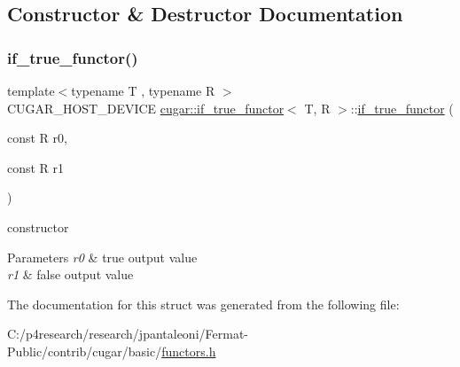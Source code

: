 \subsection{Constructor \& Destructor Documentation}
\mbox{\label{structcugar_1_1if__true__functor_a9374ed01b1416cc6eff2d6a5c8981a58}} 
\subsubsection{\texorpdfstring{if\+\_\+true\+\_\+functor()}{if\_true\_functor()}}
{\footnotesize\ttfamily template$<$typename T , typename R $>$ \\
C\+U\+G\+A\+R\+\_\+\+H\+O\+S\+T\+\_\+\+D\+E\+V\+I\+CE \hyperlink{structcugar_1_1if__true__functor}{cugar\+::if\+\_\+true\+\_\+functor}$<$ T, R $>$\+::\hyperlink{structcugar_1_1if__true__functor}{if\+\_\+true\+\_\+functor} (\begin{DoxyParamCaption}\item[{const R}]{r0,  }\item[{const R}]{r1 }\end{DoxyParamCaption})\hspace{0.3cm}{\ttfamily [inline]}}

constructor


\begin{DoxyParams}{Parameters}
{\em r0} & true output value \\
\hline
{\em r1} & false output value \\
\hline
\end{DoxyParams}


The documentation for this struct was generated from the following file\+:\begin{DoxyCompactItemize}
\item 
C\+:/p4research/research/jpantaleoni/\+Fermat-\/\+Public/contrib/cugar/basic/\hyperlink{functors_8h}{functors.\+h}\end{DoxyCompactItemize}
